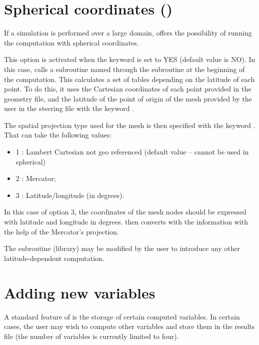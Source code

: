 \section{Spherical coordinates ()}

If a simulation is performed over a large domain,  offers the
possibility of running the computation with spherical coordinates.

This option is activated when the keyword  is set
to YES (default value is NO). In this case,  calls a subroutine named
 through the subroutine  at the beginning of the
computation. This calculates a set of tables depending on the latitude of each
point. To do this, it uses the Cartesian coordinates of each point provided in
the geometry file, and the latitude of the point of origin of the mesh provided
by the user in the steering file with the keyword
.

The spatial projection type used for the mesh is then specified with the
keyword . That can take the following values:
\begin{itemize}
\item 1 : Lambert Cartesian not geo referenced (default value -- cannot be used
in spherical)

\item 2 : Mercator;

\item 3 : Latitude/longitude (in degrees).
\end{itemize}

In this case of option 3, the coordinates of the mesh nodes should be
expressed with latitude and longitude in degrees.  then converts with
the information with the help of the Mercator's projection.

The  subroutine (\bief library) may be modified by the user to introduce
any other latitude-dependent computation.


\section{Adding new variables}
\label{sec:privarray}
A standard feature of  is the storage of certain computed variables.
In certain cases, the user may wish to compute other variables and store them
in the results file (the number of variables is currently limited to four).

